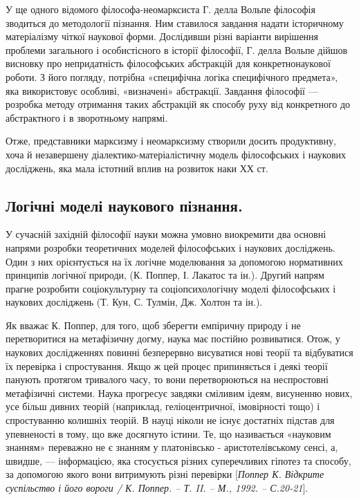 У ще одного відомого філософа-неомарксиста Г. делла Вольпе філософія
зводиться до методології пізнання. Ним ставилося завдання надати історичному
матеріалізму чіткої наукової форми. Дослідивши різні варіанти вирішення
проблеми загального і особистісного в історії філософії, Г. делла Вольпе
дійшов висновку про непридатність філософських абстракцій для конкретнонаукової роботи. З його погляду, потрібна «специфічна логіка специфічного
предмета», яка використовує особливі, «визначені» абстракції. Завдання
філософії --- розробка методу отримання таких абстракцій як способу руху від
конкретного до абстрактного і в зворотньому напрямі.

Отже, представники марксизму і неомарксизму створили досить
продуктивну, хоча й незавершену діалектико-матеріалістичну модель
філософських і наукових досліджень, яка мала істотний вплив на розвиток наки
ХХ ст.

\subsection{Логічні моделі наукового пізнання.} У сучасній західній філософії науки
можна умовно виокремити два основні напрями розробки теоретичних моделей
філософських і наукових досліджень. Один з них орієнтується на їх логічне
моделювання за допомогою нормативних принципів логічної природи,
(К. Поппер, І. Лакатос та ін.). Другий напрям прагне розробити соціокультурну
та соціопсихологічну моделі філософських і наукових досліджень (Т. Кун, С.
Тулмін, Дж. Холтон та ін.).

Як вважає К. Поппер, для того, щоб зберегти емпіричну природу і не
перетворитися на метафізичну догму, наука має постійно розвиватися. Отож, у
наукових дослідженнях повинні безперервно висуватися нові теорії та
відбуватися їх перевірка і спростування. Якщо ж цей процес припиняється і
деякі теорії панують протягом тривалого часу, то вони перетворюються на
неспростовні метафізичні системи. Наука прогресує завдяки сміливим ідеям,
висуненню нових, усе більш дивних теорій (наприклад, геліоцентричної,
імовірності тощо) і спростуванню колишніх теорій. В науці ніколи не існує
достатніх підстав для упевненості в тому, що вже досягнуто істини. Те, що
називається «науковим знанням» переважно не є знанням у платонівсько -
аристотелівському сенсі, а, швидше, --- інформацією, яка стосується різних
суперечливих гіпотез та способу, за допомогою якого вони витримують різні
перевірки [\textit{Поппер К. Відкрите суспільство і його вороги / К. Поппер. – Т. II. –
М., 1992. – С.20-21}].

